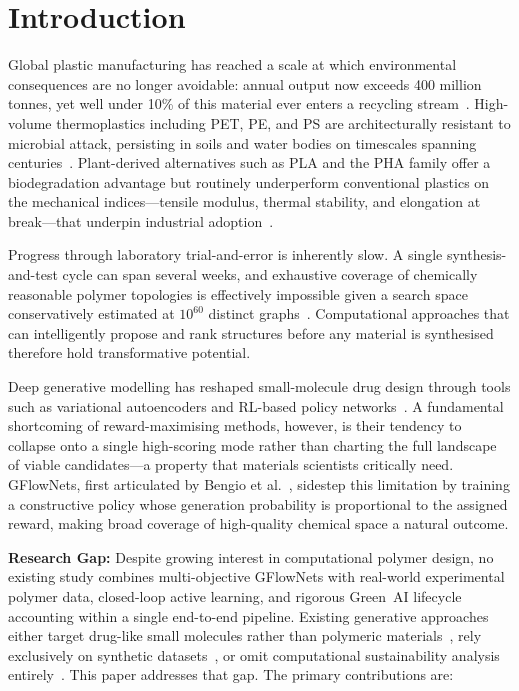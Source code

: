 \documentclass[twocolumn,10pt]{article}
\begin{document}
\section{Introduction}

Global plastic manufacturing has reached a scale at which environmental consequences are no
longer avoidable: annual output now exceeds 400 million tonnes, yet well under 10\% of this
material ever enters a recycling stream~\cite{geyer2017production}. High-volume thermoplastics
including PET, PE, and PS are architecturally resistant to microbial attack, persisting in soils
and water bodies on timescales spanning centuries~\cite{jambeck2015plastic}. Plant-derived
alternatives such as PLA and the PHA family offer a biodegradation advantage but routinely
underperform conventional plastics on the mechanical indices—tensile modulus, thermal
stability, and elongation at break—that underpin industrial adoption~\cite{hillmyer2017promise}.

Progress through laboratory trial-and-error is inherently slow. A single synthesis-and-test
cycle can span several weeks, and exhaustive coverage of chemically reasonable polymer
topologies is effectively impossible given a search space conservatively estimated at
$10^{60}$ distinct graphs~\cite{aspuru2018accelerating}. Computational approaches that can
intelligently propose and rank structures before any material is synthesised therefore hold
transformative potential.

Deep generative modelling has reshaped small-molecule drug design through tools such as
variational autoencoders and RL-based policy networks~\cite{gomez2018automatic,kusner2017grammar}.
A fundamental shortcoming of reward-maximising methods, however, is their tendency to
collapse onto a single high-scoring mode rather than charting the full landscape of viable
candidates—a property that materials scientists critically need. GFlowNets, first articulated
by Bengio et al.~\cite{bengio2021flow}, sidestep this limitation by training a constructive
policy whose generation probability is proportional to the assigned reward, making broad
coverage of high-quality chemical space a natural outcome.

\noindent\textbf{Research Gap:} Despite growing interest in computational polymer design, no existing
study combines multi-objective GFlowNets with real-world experimental polymer data, closed-loop
active learning, and rigorous Green~AI lifecycle accounting within a single end-to-end pipeline.
Existing generative approaches either target drug-like small molecules rather than polymeric
materials~\cite{bengio2021flow,jin2018junction}, rely exclusively on synthetic
datasets~\cite{kuenneth2023pi1m}, or omit computational sustainability analysis
entirely~\cite{zhou2019optimization}. This paper addresses that gap. The primary contributions are:
\end{document}
